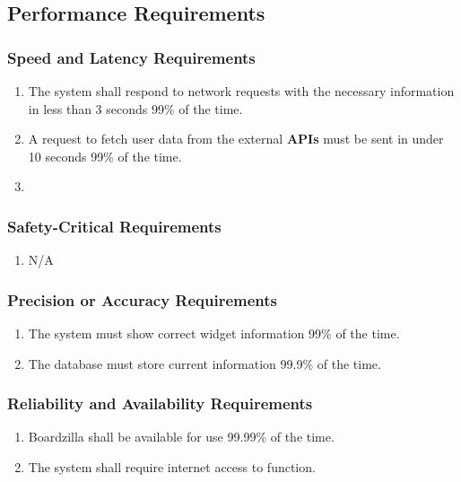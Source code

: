\documentclass[]{article}
\begin{document}
	\subsection{Performance Requirements}
	\label{sub:performance_requirements}
	
	\subsubsection{Speed and Latency Requirements}
	\label{ssub:speed_and_latency_requirements}
	\begin{enumerate}[{PR}1. ]
		\item The system shall respond to network requests with the necessary information in less than 3 seconds 99\% of the time.
		\item A request to fetch user data from the external \textbf{APIs} must be sent in under 10 seconds 99\% of the time.
		\item 
	\end{enumerate}
	
	\subsubsection{Safety-Critical Requirements}
	\label{ssub:safety_critical_requirements}
	\begin{enumerate}[{PR}1. ]
		\item N/A
	\end{enumerate}
	
	\subsubsection{Precision or Accuracy Requirements}
	\label{ssub:precision_or_accuracy_requirements}
	\begin{enumerate}[{PR}1. ]
		\item The system must show correct widget information 99\% of the time.
		\item The database must store current information 99.9\% of the time.
	\end{enumerate}
	
	\subsubsection{Reliability and Availability Requirements}
	\label{ssub:reliability_and_availability_requirements}
	\begin{enumerate}[{PR}1. ]
		\item Boardzilla shall be available for use 99.99\% of the time.
		\item The system shall require internet access to function.
	\end{enumerate}
	
\end{document}
